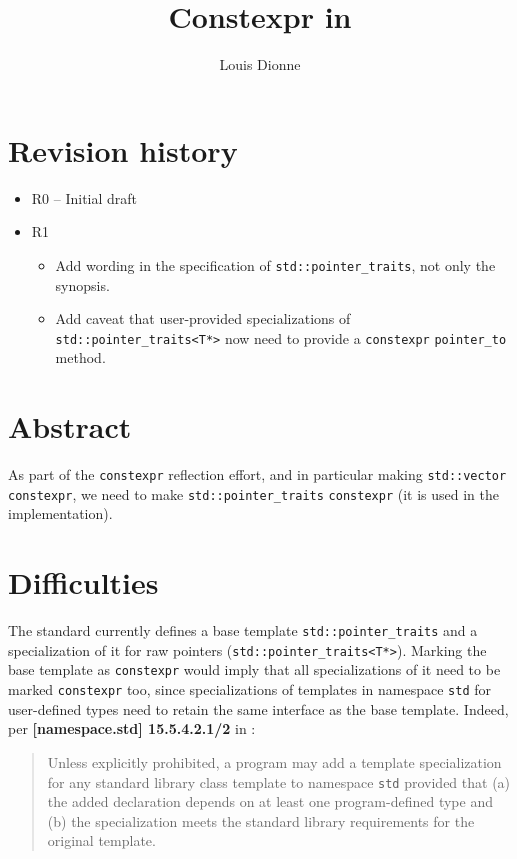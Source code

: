 \documentclass{wg21}
\title{Constexpr in \cc{std::pointer_traits}}
\author{Louis Dionne}{ldionne@apple.com}
\newcommand{\cc}[1]{\texttt{#1}}
\begin{document}
\maketitle

\section{Revision history}
\begin{itemize}
  \item R0 -- Initial draft
  \item R1 \begin{itemize}
              \item Add wording in the specification of \cc{std::pointer_traits},
                    not only the synopsis.
              \item Add caveat that user-provided specializations of
                    \cc{std::pointer_traits<T*>} now need to provide
                    a \cc{constexpr} \cc{pointer_to} method.
              \end{itemize}
\end{itemize}

\section{Abstract}
As part of the \cc{constexpr} reflection effort, and in particular making
\cc{std::vector} \cc{constexpr}, we need to make \cc{std::pointer_traits}
\cc{constexpr} (it is used in the implementation).


\section{Difficulties}
The standard currently defines a base template \cc{std::pointer_traits} and a
specialization of it for raw pointers (\cc{std::pointer_traits<T*>}). Marking
the base template as \cc{constexpr} would imply that all specializations of it
need to be marked \cc{constexpr} too, since specializations of templates in
namespace \cc{std} for user-defined types need to retain the same interface
as the base template. Indeed, per \textbf{[namespace.std] 15.5.4.2.1/2} in
\cite{N4762}:

\begin{quote}
  Unless explicitly prohibited, a program may add a template specialization for
  any standard library class template to namespace \texttt{std} provided that
  (a) the added declaration depends on at least one program-defined type and
  (b) the specialization meets the standard library requirements for the
  original template.
\end{quote}
\end{document}
